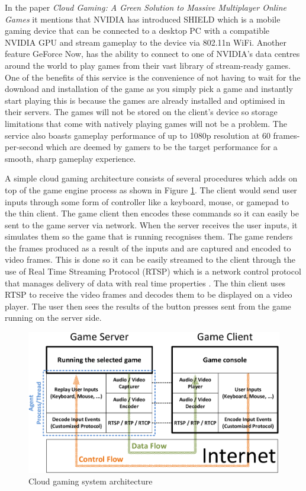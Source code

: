 \newline
\par
In the paper \textit{Cloud Gaming: A Green Solution to Massive Multiplayer Online Games} \cite{chuah2014cloud} it mentions that NVIDIA has introduced SHIELD which is a mobile gaming device that can be connected to a desktop PC with a compatible NVIDIA GPU and stream gameplay to the device via 802.11n WiFi. Another feature GeForce Now, has the ability to connect to one of NVIDIA's data centres around the world to play games from their vast library of stream-ready games. One of the benefits of this service is the convenience of not having to wait for the download and installation of the game as you simply pick a game and instantly start playing this is because the games are already installed and optimised in their servers. The games will not be stored on the client's device so storage limitations that come with natively playing games will not be a problem. The service also boasts gameplay performance of up to 1080p resolution at 60 frames-per-second which are deemed by gamers to be the target performance for a smooth, sharp gameplay experience.
\newline
\par
A simple cloud gaming architecture consists of several procedures which adds on top of the game engine process as shown in Figure \ref{fig:arch}. The client would send user inputs through some form of controller like a keyboard, mouse, or gamepad to the thin client. The game client then encodes these commands so it can easily be sent to the game server via network. When the server receives the user inputs, it simulates them so the game that is running recognises them. The game renders the frames produced as a result of the inputs and are captured and encoded to video frames. This is done so it can be easily streamed to the client through the use of Real Time Streaming Protocol (RTSP) which is a network control protocol that manages delivery of data with real time properties \cite{rtsp}. The thin client uses RTSP to receive the video frames and decodes them to be displayed on a video player. The user then sees the results of the button presses sent from the game running on the server side.

\begin{figure}[h!]
 \includegraphics[width=\linewidth]{images/arch.png}
 \caption{Cloud gaming system architecture \cite{cloudarch}}
 \label{fig:arch}
\end{figure}

